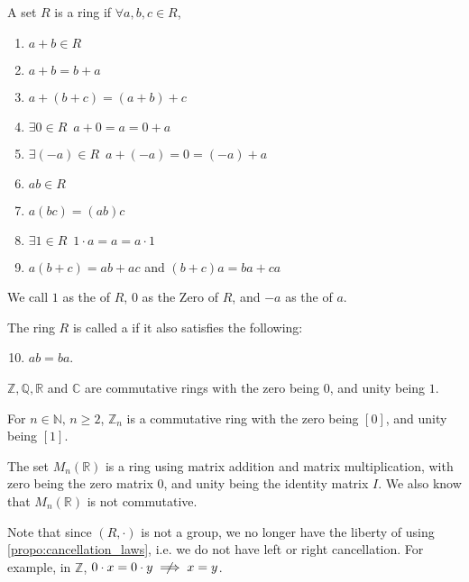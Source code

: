\begin{defn}[Ring]
\label{defn:ring}
  A set $R$ is a ring if $\forall a, b, c \in R$,
  \begin{enumerate}
    \item $a + b \in R$
    \item $a + b = b + a$
    \item $a + (b + c) = (a + b) + c$
    \item $\exists 0 \in R \enspace a + 0 = a = 0 + a$
    \item $\exists (-a) \in R \enspace a + (-a) = 0 = (-a) + a$
    \item $ab \in R$
    \item $a(bc) = (ab)c$
    \item $\exists 1 \in R \enspace 1 \cdot a = a = a \cdot 1$
    \item $a ( b + c ) = ab + ac$ and $(b + c) a = ba + ca$
  \end{enumerate}
  We call $1$ as the  of $R$, $0$ as the \textcolor{base16-eighties-blue}{Zero} of $R$, and $-a$ as the  of $a$.

  The ring $R$ is called a  if it also satisfies the following:
  \begin{enumerate}
    \setcounter{enumi}{9}
    \item $ab = ba$.
  \end{enumerate}
\end{defn}

\begin{eg}
  $\mathbb{Z}, \mathbb{Q}, \mathbb{R}$ and $\mathbb{C}$ are commutative rings with the zero being $0$, and unity being $1$.
\end{eg}

\begin{eg}
  For $n \in \mathbb{N}, \, n \geq 2$, $\mathbb{Z}_n$ is a commutative ring with the zero being $[0]$, and unity being $[1]$.
\end{eg}

\begin{eg}
  The set $M_n(\mathbb{R})$ is a ring using matrix addition and matrix multiplication, with zero being the zero matrix $0$, and unity being the identity matrix $I$. We also know that $M_n(\mathbb{R})$ is not commutative.
\end{eg}

\begin{warning}
  Note that since $(R, \cdot)$ is not a group, we no longer have the liberty of using \cref{propo:cancellation_laws}, i.e. we do not have left or right cancellation. For example, in $\mathbb{Z}$, $0 \cdot x = 0 \cdot y \notimply x = y$.
\end{warning}



